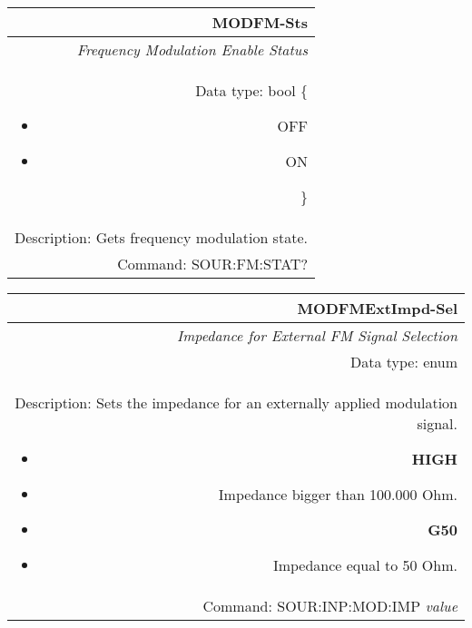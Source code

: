\documentclass[openany]{article}
\begin{document}
		\begin{tabular}{N}
			\hline
			\bfseries MODFM-Sts \\ \hline
			\emph{Frequency Modulation Enable Status} \\
			Data type: bool \{\begin{itemize}[noitemsep]
				\small
				\item[] OFF
				\item[] ON
			\end{itemize}\} \\
			Description: Gets frequency modulation state. \\
			Command: SOUR:FM:STAT? \\
			
		\end{tabular}
%
		\begin{tabular}{N}
			\hline
			\bfseries MODFMExtImpd-Sel \\ \hline
			\emph{Impedance for External FM Signal Selection} \\
			Data type: enum \\  
			Description: Sets the impedance for an externally applied modulation signal.\begin{itemize}[noitemsep]
				\small
				\item[] \textbf{HIGH}
                                \item[] Impedance bigger than 100.000 Ohm.
                                \item[] \textbf{G50}
                                \item[] Impedance equal to 50 Ohm.
			\end{itemize} \\
			Command: SOUR:INP:MOD:IMP \emph{value} \\

		\end{tabular}
\end{document}
